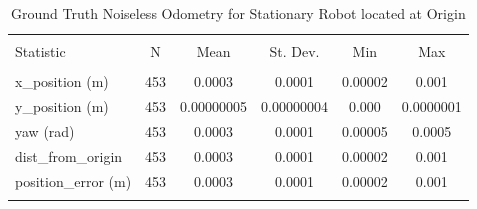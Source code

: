 
\begin{table}[htbp] \centering 
  \caption{Ground Truth Noiseless Odometry for Stationary Robot located at Origin} 
  \label{tab:gazebo_stationary_noiseless_summary} 
\begin{tabular}{@{\extracolsep{5pt}}lccccc} 
\\[-1.8ex]\hline 
\hline \\[-1.8ex] 
Statistic & \multicolumn{1}{c}{N} & \multicolumn{1}{c}{Mean} & \multicolumn{1}{c}{St. Dev.} & \multicolumn{1}{c}{Min} & \multicolumn{1}{c}{Max} \\ 
\hline \\[-1.8ex] 
x\_position (m) & 453 & \num{0.0003} & \num{0.0001} & \num{0.00002} & \num{0.001} \\ 
y\_position (m) & 453 & \num{0.00000005} & \num{0.00000004} & \num{0.000} & \num{0.0000001} \\ 
yaw (rad) & 453 & \num{0.0003} & \num{0.0001} & \num{0.00005} & \num{0.0005} \\ 
dist\_from\_origin & 453 & \num{0.0003} & \num{0.0001} & \num{0.00002} & \num{0.001} \\ 
position\_error (m) & 453 & \num{0.0003} & \num{0.0001} & \num{0.00002} & \num{0.001} \\ 
\hline \\[-1.8ex] 
\end{tabular} 
\end{table} 
